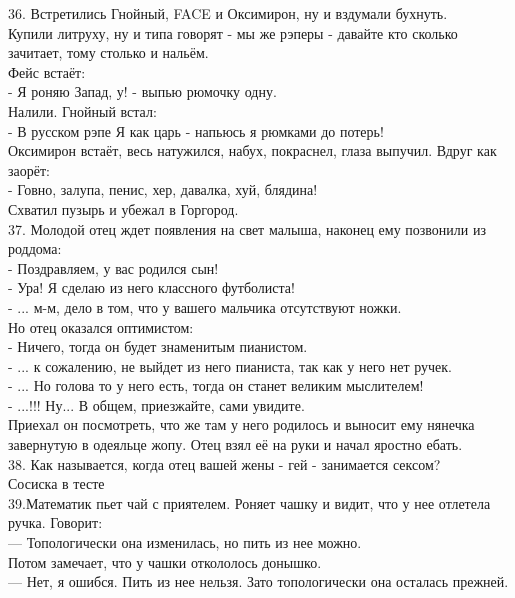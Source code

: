 \documentclass[a4paper,20pt,notitlepage]{extbook}
\begin{document}
	36. Встретились Гнойный, FACE и Оксимирон, ну и вздумали бухнуть.\\
	 Купили литруху, ну и типа говорят - мы же рэперы - давайте кто сколько зачитает, тому столько и нальём.\\
	Фейс встаёт:\\
	- Я роняю Запад, у! - выпью рюмочку одну.\\
	Налили. Гнойный встал:\\
	- В русском рэпе Я как царь - напьюсь я рюмками до потерь!\\
	Оксимирон встаёт, весь натужился, набух, покраснел, глаза выпучил. Вдруг как заорёт:\\
	- Говно, залупа, пенис, хер, давалка, хуй, блядина!\\
	Схватил пузырь и убежал в Горгород.\\
	
	37. Молодой отец ждет появления на свет малыша, наконец ему позвонили из 
	роддома: \\
	- Поздравляем, у вас родился сын! \\
	- Ура! Я сделаю из него классного футболиста! \\
	- ... м-м, дело в том, что у вашего мальчика отсутствуют ножки. \\
	Но отец оказался оптимистом: \\
	- Ничего, тогда он будет знаменитым пианистом. \\
	- ... к сожалению, не выйдет из него пианиста, так как у него нет ручек. \\
	- ... Но голова то у него есть, тогда он станет великим мыслителем! \\
	- ...!!! Ну... В общем, приезжайте, сами увидите. \\
	Приехал он посмотреть, что же там у него родилось и выносит ему нянечка \\
	завернутую в одеяльце жопу. Отец взял её на руки и начал яростно ебать.\\
	
	38. Как называется, когда отец вашей жены - гей - занимается сексом?\\
	Сосиска в тесте\\
	
	39.Математик пьет чай с приятелем. Роняет чашку и видит, что у нее отлетела ручка. Говорит:\\
	— Топологически она изменилась, но пить из нее можно.\\
	Потом замечает, что у чашки откололось донышко.\\
	— Нет, я ошибся. Пить из нее нельзя. Зато топологически она осталась прежней.\\
	
\end{document}
